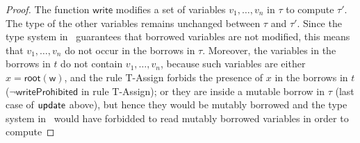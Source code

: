 \begin{proof}
  The function $\mathsf{write}$ modifies a set of variables $v_1,\ldots,v_n$ in $\tau$ to compute $\tau'$.
  The type of the other variables remains unchanged between $\tau$ and $\tau'$. Since the
  type system in~\cite{Pearce21} guarantees that borrowed variables are not modified,
  this means that $v_1,\ldots,v_n$ do not occur in the borrows in $\tau$. Moreover,
  the variables in the borrows in $t$ do not contain $v_1,\ldots,v_n$, because
  such variables are either $x=\mathsf{root}(\mathsf{w})$, and the rule \textsf{T-Assign}
  forbids the presence of $x$ in the borrows in $t$ ($\neg\mathsf{writeProhibited}$ in rule
  \textsf{T-Assign}); or they are inside a mutable borrow in $\tau$ (last case of
  $\mathsf{update}$ above), but hence they would be mutably borrowed and the type system
  in~\cite{Pearce21} would have forbidded to read mutably borrowed variables in order to compute

\end{proof}
